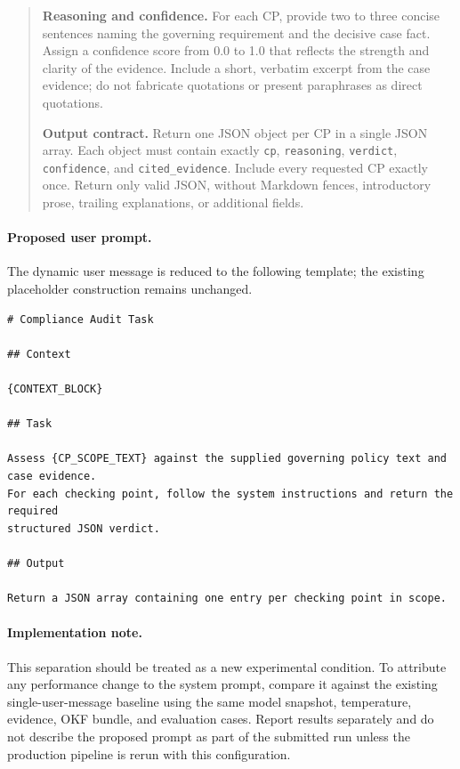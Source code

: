 \begin{quote}
\medskip
\textbf{Reasoning and confidence.}
For each CP, provide two to three concise sentences naming the governing
requirement and the decisive case fact. Assign a confidence score from 0.0 to 1.0
that reflects the strength and clarity of the evidence. Include a short, verbatim
excerpt from the case evidence; do not fabricate quotations or present paraphrases
as direct quotations.

\medskip
\textbf{Output contract.}
Return one JSON object per CP in a single JSON array. Each object must contain
exactly \texttt{cp}, \texttt{reasoning}, \texttt{verdict}, \texttt{confidence},
and \texttt{cited\_evidence}. Include every requested CP exactly once. Return only
valid JSON, without Markdown fences, introductory prose, trailing explanations,
or additional fields.
\end{quote}

\paragraph{Proposed user prompt.}
The dynamic user message is reduced to the following template; the existing
placeholder construction remains unchanged.

\begin{verbatim}
# Compliance Audit Task

## Context

{CONTEXT_BLOCK}

## Task

Assess {CP_SCOPE_TEXT} against the supplied governing policy text and case evidence.
For each checking point, follow the system instructions and return the required
structured JSON verdict.

## Output

Return a JSON array containing one entry per checking point in scope.
\end{verbatim}

\paragraph{Implementation note.}
This separation should be treated as a new experimental condition. To attribute
any performance change to the system prompt, compare it against the existing
single-user-message baseline using the same model snapshot, temperature, evidence,
OKF bundle, and evaluation cases. Report results separately and do not describe
the proposed prompt as part of the submitted run unless the production pipeline is
rerun with this configuration.


